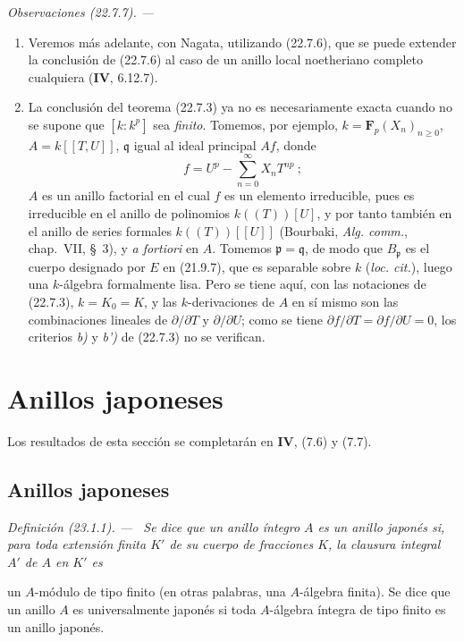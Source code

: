 \documentclass[10pt,oneside]{book}
\makeatletter
\newcommand{\setmanualcurrentlabel}[1]{\def\@currentlabel{#1}}
\newcommand{\oldpage}[2][]{%
  \setcounter{footnote}{0}%
  \marginpar{\scriptsize\textbf{#1}~|~#2}\ignorespaces}
\newenvironment{definition}[1][]{%
  \setmanualcurrentlabel{#1}\par\medskip\noindent\itshape Definición (#1). ---\ }{\par}
\newenvironment{remarks}[1][]{%
  \setmanualcurrentlabel{#1}\par\medskip\noindent\itshape Observaciones (#1). ---\ }{\par}
\providecommand{\setmin}{-}%
\makeatother
\begin{document}
\begin{remarks}[22.7.7]
\label{0.22.7.7-es}
\begin{enumerate}
  \item[(i)] Veremos más adelante, con Nagata, utilizando (22.7.6), que
  se puede extender la conclusión de (22.7.6) al caso de un anillo local
  noetheriano completo cualquiera (\textbf{IV}, 6.12.7).

  \item[(ii)] La conclusión del teorema (22.7.3) ya no es necesariamente
  exacta cuando no se supone que $[k:k^p]$ sea \emph{finito}. Tomemos, por
  ejemplo, $k=\mathbf F_p(X_n)_{n\geqslant0}$,
  $A=k[[T,U]]$, $\mathfrak q$ igual al ideal principal $Af$, donde
  \[
    f=U^p\setmin\sum_{n=0}^{\infty}X_nT^{np}~;
  \]
  $A$ es un anillo factorial en el cual $f$ es un elemento irreducible, pues es
  irreducible en el anillo de polinomios $k((T))[U]$, y por tanto también en
  el anillo de series formales $k((T))[[U]]$ (Bourbaki,
  \emph{Alg. comm.}, chap.~VII, §~3), y \emph{a fortiori} en $A$.
  Tomemos $\mathfrak p=\mathfrak q$, de modo que $B_{\mathfrak p}$ es el
  cuerpo designado por $E$ en (21.9.7), que es separable sobre $k$
  (\emph{loc. cit.}), luego una $k$-álgebra formalmente lisa. Pero se tiene aquí,
  con las notaciones de (22.7.3), $k=K_0=K$, y las $k$-derivaciones de $A$
  en sí mismo son las combinaciones lineales de $\partial/\partial T$ y
  $\partial/\partial U$; como se tiene
  $\partial f/\partial T=\partial f/\partial U=0$, los criterios \emph{b)} y \emph{b')} de
  (22.7.3) no se verifican.
\end{enumerate}
\end{remarks}

\section{Anillos japoneses}
\label{section:0.23-es}

Los resultados de esta sección se completarán en \textbf{IV}, (7.6) y (7.7).

\subsection{Anillos japoneses}
\label{subsection:0.23.1-es}

\begin{definition}[23.1.1]
\label{0.23.1.1-es}
Se dice que un anillo íntegro $A$ es un anillo japonés si, para toda
extensión finita $K'$ de su cuerpo de fracciones $K$, la clausura integral
$A'$ de $A$ en $K'$ es

\oldpage[0\textsubscript{IV-1}]{214}

un $A$-módulo de tipo finito \textup{(en otras palabras, una $A$-álgebra} finita\textup{)}. Se dice
que un anillo $A$ es universalmente japonés si toda $A$-álgebra íntegra de
tipo finito es un anillo japonés.
\end{definition}
\end{document}
